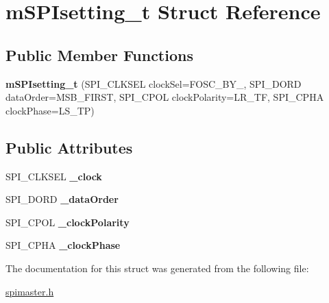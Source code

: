 \hypertarget{structmSPIsetting__t}{}\section{m\+S\+P\+Isetting\+\_\+t Struct Reference}
\label{structmSPIsetting__t}
\subsection*{Public Member Functions}
\begin{DoxyCompactItemize}
\item 
\mbox{\label{structmSPIsetting__t_a8e24b798a3f9dcd4f90fadffbcab0503}} 
{\bfseries m\+S\+P\+Isetting\+\_\+t} (S\+P\+I\+\_\+\+C\+L\+K\+S\+EL clock\+Sel=F\+O\+S\+C\+\_\+\+B\+Y\+\_, S\+P\+I\+\_\+\+D\+O\+RD data\+Order=M\+S\+B\+\_\+\+F\+I\+R\+ST, S\+P\+I\+\_\+\+C\+P\+OL clock\+Polarity=L\+R\+\_\+\+TF, S\+P\+I\+\_\+\+C\+P\+HA clock\+Phase=L\+S\+\_\+\+TP)
\end{DoxyCompactItemize}
\subsection*{Public Attributes}
\begin{DoxyCompactItemize}
\item 
\mbox{\label{structmSPIsetting__t_a808514c1d694629406dbafc8d09d6aac}} 
S\+P\+I\+\_\+\+C\+L\+K\+S\+EL {\bfseries \+\_\+clock}
\item 
\mbox{\label{structmSPIsetting__t_a8de7023e2f95faed221ee03a3cf5dd93}} 
S\+P\+I\+\_\+\+D\+O\+RD {\bfseries \+\_\+data\+Order}
\item 
\mbox{\label{structmSPIsetting__t_aa831f0b03d1dfad178c75dc2d4f70904}} 
S\+P\+I\+\_\+\+C\+P\+OL {\bfseries \+\_\+clock\+Polarity}
\item 
\mbox{\label{structmSPIsetting__t_ae5bee01044abda654f22370844528d21}} 
S\+P\+I\+\_\+\+C\+P\+HA {\bfseries \+\_\+clock\+Phase}
\end{DoxyCompactItemize}


The documentation for this struct was generated from the following file\+:\begin{DoxyCompactItemize}
\item 
\hyperlink{spimaster_8h}{spimaster.\+h}\end{DoxyCompactItemize}
